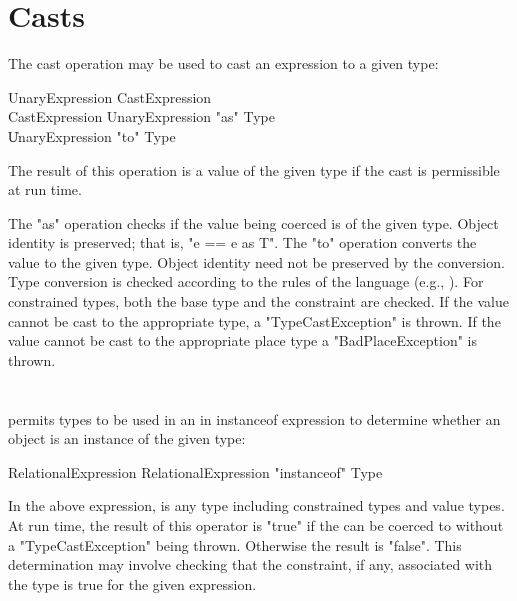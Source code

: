 \section{Casts}\label{ClassCast}

The cast operation may be used to cast an expression to a given type:

\begin{grammar}
UnaryExpression \: CastExpression \\
CastExpression \: UnaryExpression \xcd"as" Type \\
\| UnaryExpression \xcd"to" Type \\
\end{grammar}

The result of this operation is a value of the given type if the cast
is permissible at run time.

The \xcd"as" operation checks if the value being coerced is of
the given type.  Object identity is preserved; that is,
\xcd"e == e as T".
The \xcd"to" operation converts the value to the given type. 
Object identity need not be preserved by the conversion.
Type conversion is checked according to the
rules of the \java{} language (e.g., \cite[\S 5.5]{jls2}).
For constrained types, both the base
type and the constraint are checked.
If the
value cannot be cast to the appropriate type, a
\xcd"TypeCastException"
is thrown. If the value cannot be cast to the
appropriate place type a \xcd"BadPlaceException" is thrown. 


\section{}\label{instanceOf}

\Xten{} permits types to be used in an in instanceof expression
to determine whether an object is an instance of the given type:

\begin{grammar}
RelationalExpression \: RelationalExpression \xcd"instanceof" Type
\end{grammar}

In the above expression,  is any type including
constrained types and value types. 
At run time, the result of this operator is
\xcd"true" if the  can be
coerced
to  without a \xcd"TypeCastException" being
thrown.  Otherwise the result is \xcd"false".
This determination may involve checking
that the
constraint, if any, associated with the type is true for the
given expression.

